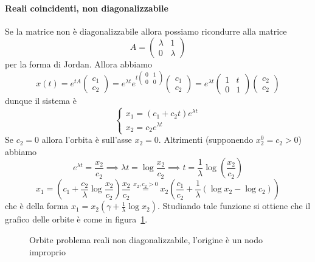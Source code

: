 \paragraph{Reali coincidenti, non diagonalizzabile} Se la matrice non è diagonalizzabile
allora possiamo ricondurre alla matrice
\[
  A = \begin{pmatrix}
      \lambda & 1 \\
      0 & \lambda
  \end{pmatrix}
\]
per la forma di Jordan. Allora abbiamo
\[
  x{(t)} = e^{tA}\begin{pmatrix}
      c_{1} \\
      c_{2}
  \end{pmatrix} = e^{\lambda t} e^{t \begin{pmatrix}
      0 & 1 \\
      0 & 0
  \end{pmatrix}} \begin{pmatrix}
      c_{1} \\
      c_{2}
  \end{pmatrix} = e^{\lambda t} \begin{pmatrix}
      1 & t \\
      0 & 1
  \end{pmatrix} \begin{pmatrix}
      c_{2} \\
      c_{2}
  \end{pmatrix} 
\]
dunque il sistema è
\[
  \begin{cases}
      x_{1} = {(c_{1} + c_{2} t)} e^{\lambda t} \\
      x_{2} = c_{2} e^{\lambda t}
  \end{cases}
\]
Se \(c_{2} = 0\) allora l'orbita è sull'asse \(x_{2} = 0\). Altrimenti
(supponendo \(x_{2}^{0} = c_{2} > 0\)) abbiamo
\[
  e^{\lambda t} = \frac{x_{2}}{c_{2}} \implies \lambda t = \log
  \frac{x_{2}}{c_{2}} \implies t = \frac{1}{\lambda} \log{(\frac{x_{2}}{c_{2}})}
\]
\[
  x_{1} = {\left( c_{1}+\frac{c_{2}}{\lambda} \log \frac{x_{2}}{c_{2}} \right)}
  \frac{x_{2}}{c_{2}} \overset{x_{2}, c_{2} > 0}{=} x_{2}{\left(
  \frac{c_{1}}{c_{2}} + \frac{1}{\lambda}{(\log x_{2} - \log c_{2})} \right)} 
\]
che è della forma \(\displaystyle x_{1} = x_{2}{\left( \gamma +
\frac{1}{\lambda}\log x_{2} \right)} \). Studiando tale funzione si ottiene che
il grafico delle orbite è come in
figura~\ref{fig:orbite-problema-reali-non-diagonalizzabile}.
\begin{figure}[ht]
    \centering
    \caption{Orbite problema reali non diagonalizzabile, l'origine è un nodo
    improprio}\label{fig:orbite-problema-reali-non-diagonalizzabile}
\end{figure}

